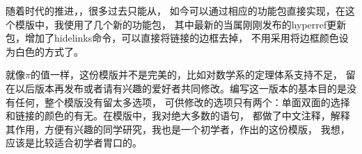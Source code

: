 \begin{preface}
随着时代的推进，，很多过去只能从，
如今可以通过相应的功能包直接实现，在这个模版中，我使用了几个新的功能包，
其中最新的当属刚刚发布的hyperref更新包，增加了hidelinks命令，可以直接将链接的边框去掉，
不用采用将边框颜色设为白色的方式了。

就像$\pi$的值一样，这份模版并不是完美的，比如对数学系的定理体系支持不足，
留在以后版本再发布或者请有兴趣的爱好者共同修改。编写这一版本的基本目的是没有任何，整个模版没有留太多选项，
可供修改的选项只有两个：单面双面的选择和链接的颜色的有无。在模版中，我对绝大多数的语句，
都做了中文注释，解释其作用，方便有兴趣的同学研究，我也是一个初学者，作出的这份模版，
我想，应该是比较适合初学者胃口的。

\end{preface}
